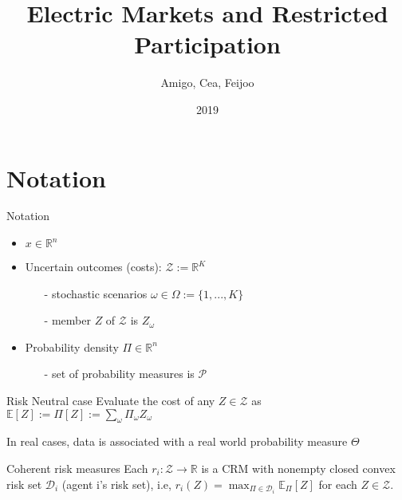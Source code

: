 \documentclass{beamer}
\title[Your Short Title]{Electric Markets and Restricted Participation}
\author{Amigo, Cea, Feijoo}
\institute{EII - PUCV}
\date{2019}
\begin{document}
\begin{frame}
  \titlepage
\end{frame}


\section{Notation}

\begin{frame}{Notation}


\begin{itemize}
    \item $x \in \mathbb{R}^n$
    \item Uncertain outcomes (costs): $\mathcal{Z} := \mathbb{R}^K$
    \begin{itemize}
        \item[-]stochastic scenarios $\omega \in \Omega:= \{ 1, ..., K \}$
        \item[-]member $Z$ of  $\mathcal{Z}$ is $Z_{\omega}$
    \end{itemize}
    \item Probability density $\Pi \in \mathbb{R}^n$
    \begin{itemize}
        \item[-] set of probability measures is $\mathcal{P}$
    \end{itemize}
\end{itemize}



\vskip 0.5cm

\begin{block}{Risk Neutral case}
Evaluate the cost of any $Z \in \mathcal{Z}$ as
$\mathbb{E}[Z] := \Pi [Z] := \sum\limits_{\omega} \Pi_{\omega} Z_{\omega}$

{\footnotesize In real cases, data is associated with a real world probability measure $\Theta$}
\end{block}

\begin{block}{Coherent risk measures}
Each $r_i : \mathcal{Z} \rightarrow \mathbb{R}$ is a CRM with nonempty closed convex risk set $\mathcal{D}_i$ (agent i's risk set), i.e, $r_i(Z) = \max_{\Pi \in \mathcal{D}_i} \mathbb{E}_\Pi [Z]$ for each $Z \in \mathcal{Z}$. 


\end{block}

\end{frame}
\end{document}
